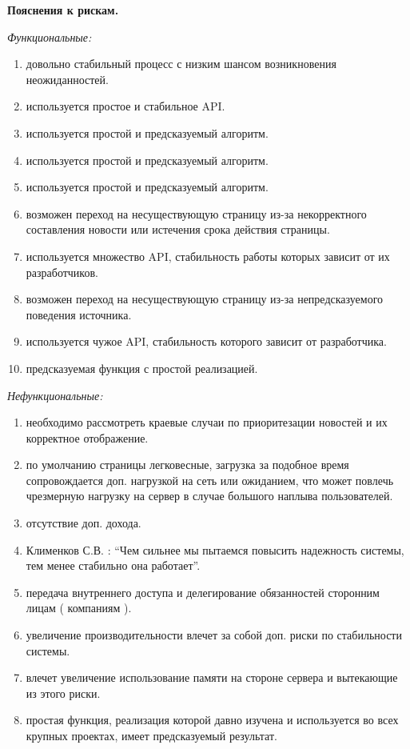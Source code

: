 \vspace{0.5cm}
\begin{center}
    \large
    \textbf{Пояснения к рискам.}\\
\end{center}
\normalsize
\textit{Функциональные:}
\begin{enumerate}[noitemsep,topsep=0pt,parsep=0pt,partopsep=0pt]
    \item довольно стабильный процесс с низким шансом возникновения неожиданностей.
    \item используется простое и стабильное API.
    \item используется простой и предсказуемый алгоритм.
    \item используется простой и предсказуемый алгоритм.
    \item используется простой и предсказуемый алгоритм.
    \item возможен переход на несуществующую страницу из-за некорректного составления новости или истечения срока действия страницы.
    \item используется множество API, стабильность работы которых зависит от их разработчиков.
    \item возможен переход на несуществующую страницу из-за непредсказуемого поведения источника.
    \item используется чужое API, стабильность которого зависит от разработчика.
    \item предсказуемая функция с простой реализацией.
\end{enumerate}
\BgThispage
\textit{Нефункциональные:}
\begin{enumerate}[noitemsep,topsep=0pt,parsep=0pt,partopsep=0pt]
    \item необходимо рассмотреть краевые случаи по приоритезации новостей и их корректное отображение.
    \item по умолчанию страницы легковесные, загрузка за подобное время сопровождается доп. нагрузкой на сеть или ожиданием, что может повлечь чрезмерную нагрузку на сервер в случае большого наплыва пользователей.
    \item отсутствие доп. дохода.
    \item Клименков С.В. : “Чем сильнее мы пытаемся повысить надежность системы, тем менее стабильно она работает”.
    \item передача внутреннего доступа и делегирование обязанностей сторонним лицам ( компаниям ).
    \item увеличение производительности влечет за собой доп. риски по стабильности системы.
    \item влечет увеличение использование памяти на стороне сервера и вытекающие из этого риски.
    \item простая функция, реализация которой давно изучена и используется во всех крупных проектах, имеет предсказуемый результат.
\end{enumerate}
